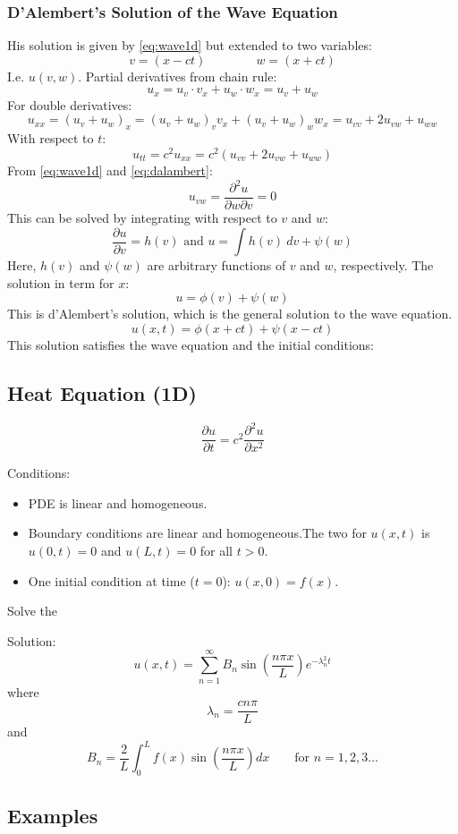 \subsubsection{D’Alembert’s Solution of the Wave Equation}
His solution is given by \cref{eq:wave1d} but extended to two variables:
\begin{equation}
  v=(x-ct) \quad\quad\quad\quad w=(x+ct)
  \label{eq:dalambert}
\end{equation}
I.e. $u(v,w)$. Partial derivatives from chain rule:
\[
  u_x=u_v \cdot v_x+u_w\cdot w_x=u_v+u_w
\]
For double derivatives:
\[
  u_{xx}=(u_v+u_w)_x=(u_v+u_w)_v v_x+(u_v+u_w)_w w_x=u_{vv}+2u_{vw}+u_{ww}
\]
With respect to $t$:
\[
  u_{tt}=c^2u_{xx}=c^2(u_{vv}+2u_{vw}+u_{ww})
\]
From \cref{eq:wave1d} and \cref{eq:dalambert}:
\[
  u_{vw}=\frac{\partial^2u}{\partial w \partial v}=0
\]
This can be solved by integrating with respect to $v$ and $w$:
\[
  \frac{\partial u}{\partial v}=h(v) \text{ and } u=\int h(v)\ dv + \psi(w)
\]
Here, $h(v)$ and $\psi(w)$ are arbitrary functions of $v$ and $w$, respectively.
The solution in term for $x$:
\[
  u=\phi(v)+\psi(w)
\]
This is d'Alembert's solution, which is the general solution to the wave equation.
\[
  u(x,t)=\phi(x+ct)+\psi(x-ct)
\]
This solution satisfies the wave equation and the initial conditions:




\subsection{Heat Equation (1D)}
\begin{equation}
  \frac{\partial u}{\partial t}=c^2\frac{\partial^2 u}{\partial x^2}
  \label{eq:Heat1D}
\end{equation}

Conditions:
\begin{itemize}
  \item PDE is linear and homogeneous.
  \item Boundary conditions are linear and homogeneous.The two for $u(x,t)$ is $u(0,t)=0$ and $u(L,t)=0$ for all $t>0$.
  \item One initial condition at time ($t=0$): $u(x,0)=f(x)$.
\end{itemize}
Solve the 

Solution:
$$u(x,t)=\sum_{n=1}^{\infty}B_n\sin\left(\frac{n\pi x}{L}\right)e^{-\lambda_n^2t}$$
where
$$\lambda_n = \frac{cn\pi}{L}$$
and
$$B_n = \frac{2}{L}\int_0^Lf(x)\sin\left(\frac{n\pi x}{L}\right)dx\quad\quad \text{for }n=1,2,3\dots$$
\subsection{Examples}
